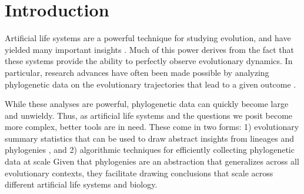 \section{Introduction} \label{sec:introduction}

Artificial life systems are a powerful technique for studying evolution, and have yielded many important insights \citep{wilkeEvolutionDigitalOrganisms2001, zamanCoevolutionDrivesEmergence2014, goldsbyEvolutionaryOriginSomatic2014}.
Much of this power derives from the fact that these systems provide the ability to perfectly observe evolutionary dynamics. 
In particular, research advances have often been made possible by analyzing phylogenetic data on the evolutionary trajectories that lead to a given outcome \citep{lenskiEvolutionaryOriginComplex2003, lalejiniEvolutionaryOriginsPhenotypic2016, johnsonEndosymbiosisBustInfluence2022a}.

While these analyses are powerful, phylogenetic data can quickly become large and unwieldy. Thus, as artificial life systems and the questions we posit become more complex, better tools are in need. These come in two forms: 1) evolutionary summary statistics that can be used to draw abstract insights from lineages and phylogenies \citep{dolsonInterpretingTapeLife2020}, and 2) algorithmic techniques for efficiently collecting phylogenetic data at scale \citep{morenoHereditaryStratigraphyGenome2022} Given that phylogenies are an abstraction that generalizes across all evolutionary contexts, they facilitate drawing conclusions that scale across different artificial life systems and biology. 



